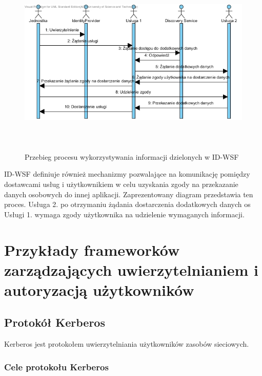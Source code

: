 	\begin{figure}[h]
		\centering
			\includegraphics[width=15cm,height=9cm]{img/id-wsf.jpg}
		\caption{Przebieg procesu wykorzystywania informacji dzielonych w ID-WSF}
		\label{Przebieg procesu wykorzystywania informacji dzielonych w ID-WSF}
	\end{figure}

	ID-WSF definiuje również mechanizmy pozwalające na komunikację pomiędzy dostawcami usług i użytkownikiem w celu uzyskania zgody na przekazanie danych osobowych do innej aplikacji. Zaprezentowany diagram przedstawia ten proces. Usługa 2. po otrzymaniu żądania dostarczenia dodatkowych danych os Usługi 1. wymaga zgody użytkownika na udzielenie wymaganych informacji.
	

\section{Przykłady frameworków zarządzających uwierzytelnianiem i autoryzacją użytkowników}
\label{sec:frameworki}

	\subsection{Protokół Kerberos}

		Kerberos jest protokołem uwierzytelniania użytkowników zasobów sieciowych.

		\subsubsection{Cele protokołu Kerberos}

